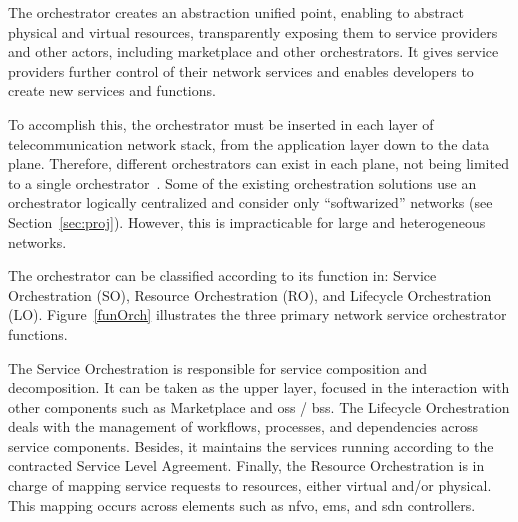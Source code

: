 The orchestrator creates an abstraction unified point, enabling to abstract physical and virtual resources, transparently exposing them to service providers and other actors, including marketplace and other orchestrators. It gives service providers further control of their network services and enables developers to create new services and functions.

To accomplish this, the orchestrator must be inserted in each layer of telecommunication network stack, from the application layer down to the data plane. Therefore, different orchestrators can exist in each plane, not being limited to a single orchestrator~\cite{Alvizu2016AdvanceEra}. Some of the existing orchestration solutions use an orchestrator logically centralized and consider only ``softwarized'' networks (see Section~\ref{sec:proj}). However, this is impracticable for large and heterogeneous networks. 

The orchestrator can be classified according to its function in: Service Orchestration (SO), Resource Orchestration (RO), and Lifecycle Orchestration (LO). Figure~\ref{funOrch} illustrates the three primary network service orchestrator functions.

The Service Orchestration is responsible for service composition and decomposition. It can be taken as the upper layer, focused in the interaction with other components such as Marketplace and \gls{oss} / \gls{bss}. The Lifecycle Orchestration deals with the management of workflows, processes, and dependencies across service components. Besides, it maintains the services running according to the contracted Service Level Agreement. Finally, the Resource Orchestration is in charge of mapping service requests to resources, either virtual and/or physical. This mapping occurs across elements such as \gls{nfvo}, \gls{ems}, and \gls{sdn} controllers.

